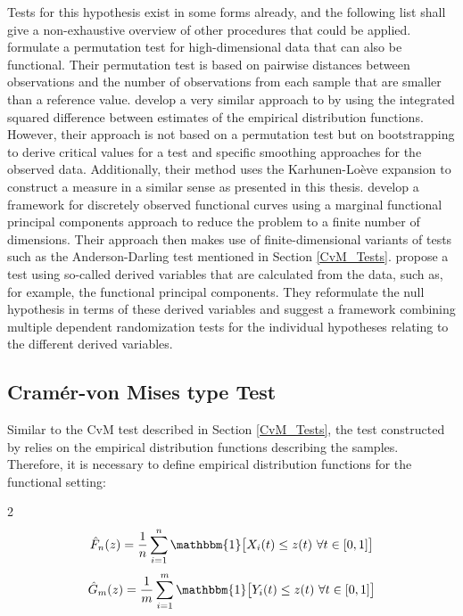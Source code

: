 \documentclass[12pt, a4paper]{article}
\theoremstyle{MAstyle} \newtheorem{assumption}{Assumption}[section]
\theoremstyle{MAstyle} \newtheorem{definition}{Definition}[section]
\theoremstyle{MAstyle} \newtheorem{theorem}{Theorem}[section]
\begin{document}
			Tests for this hypothesis exist in some forms already, and the following list shall give a non-exhaustive overview of other procedures that could be applied. \cite{hall_permutation_2002} formulate a permutation test for high-dimensional data that can also be functional. Their permutation test is based on pairwise distances between observations and the number of observations from each sample that are smaller than a reference value. 			
			\cite{hall_two-sample_2007} develop a very similar approach to \cite{bugni_permutation_2021} by using the integrated squared difference between estimates of the empirical distribution functions. However, their approach is not based on a permutation test but on bootstrapping to derive critical values for a test and specific smoothing approaches for the observed data. Additionally, their method uses the Karhunen-Lo\`{e}ve expansion to construct a measure in a similar sense as presented in this thesis.
			\cite{pomann_two-sample_2016} develop a framework for discretely observed functional curves using a marginal functional principal components approach to reduce the problem to a finite number of dimensions. Their approach then makes use of finite-dimensional variants of tests such as the Anderson-Darling test mentioned in Section \ref{CvM_Tests}.
			\cite{corain_new_2014} propose a test using so-called derived variables that are calculated from the data, such as, for example, the functional principal components. They reformulate the null hypothesis in terms of these derived variables and suggest a framework combining multiple dependent randomization tests for the individual hypotheses relating to the different derived variables.
		
		\subsection{Cram\'{e}r-von Mises type Test}\label{cvm_type_test}
			Similar to the CvM test described in Section \ref{CvM_Tests}, the test constructed by \cite{bugni_permutation_2021} relies on the empirical distribution functions describing the samples. 
			Therefore, it is necessary to define empirical distribution functions for the functional setting:
			\begin{multicols}{2}
				\noindent
				\begin{equation*}
					\hat{F}_n(z) = \frac{1}{n} \sum_{i = 1}^{n}\mathbbm{1}\big[X_i(t) \leq z(t) \ \forall t \in [0,1]\big]
				\end{equation*}
				\begin{equation}
					\hat{G}_m(z) = \frac{1}{m} \sum_{i = 1}^{m}\mathbbm{1}\big[Y_i(t) \leq z(t) \ \forall t \in [0,1]\big]
				\end{equation}
			\end{multicols}
			
\end{document}
